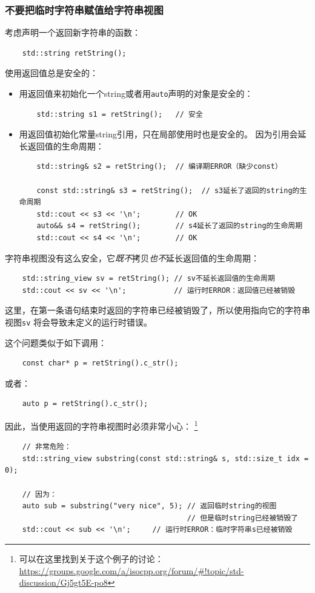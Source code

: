 \subsubsection{不要把临时字符串赋值给字符串视图}
考虑声明一个返回新字符串的函数：
\begin{lstlisting}
    std::string retString();
\end{lstlisting}
使用返回值总是安全的：
\begin{itemize}
    \item 用返回值来初始化一个string或者用\texttt{auto}声明的对象是安全的：
    \begin{lstlisting}
    std::string s1 = retString();   // 安全
    \end{lstlisting}
    \item 用返回值初始化常量string引用，只在局部使用时也是安全的。
    因为引用会延长返回值的生命周期：
    \begin{lstlisting}
    std::string& s2 = retString();  // 编译期ERROR（缺少const）

    const std::string& s3 = retString();  // s3延长了返回的string的生命周期
    std::cout << s3 << '\n';        // OK
    auto&& s4 = retString();        // s4延长了返回的string的生命周期
    std::cout << s4 << '\n';        // OK
    \end{lstlisting}
\end{itemize}
字符串视图没有这么安全，它\emph{既不}拷贝\emph{也不}延长返回值的生命周期：
\begin{lstlisting}
    std::string_view sv = retString(); // sv不延长返回值的生命周期
    std::cout << sv << '\n';           // 运行时ERROR：返回值已经被销毁
\end{lstlisting}
这里，在第一条语句结束时返回的字符串已经被销毁了，所以使用指向它的字符串视图\texttt{sv}
将会导致未定义的运行时错误。

这个问题类似于如下调用：
\begin{lstlisting}
    const char* p = retString().c_str();
\end{lstlisting}
或者：
\begin{lstlisting}
    auto p = retString().c_str();
\end{lstlisting}
因此，当使用返回的字符串视图时必须非常小心：
\footnote{可以在这里找到关于这个例子的讨论：
\url{https://groups.google.com/a/isocpp.org/forum/\#!topic/std-discussion/Gj5gt5E-po8}}
\begin{lstlisting}
    // 非常危险：
    std::string_view substring(const std::string& s, std::size_t idx = 0);

    // 因为：
    auto sub = substring("very nice", 5); // 返回临时string的视图
                                          // 但是临时string已经被销毁了
    std::cout << sub << '\n';     // 运行时ERROR：临时字符串s已经被销毁
\end{lstlisting}

